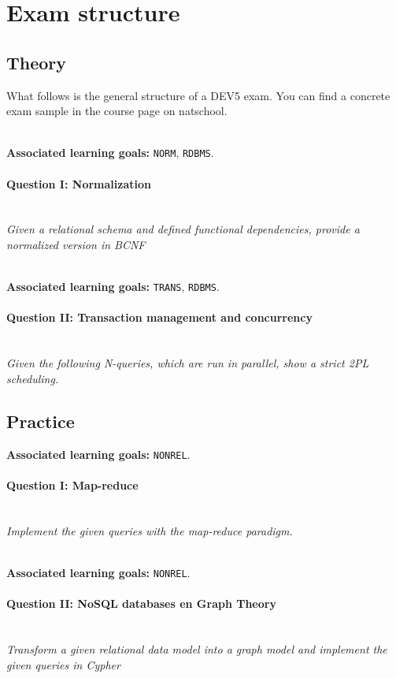 \section*{Exam structure}
\subsection*{Theory}
What follows is the general structure of a DEV5 exam. You can find a concrete exam sample in the course page on natschool.


\ \\ 
\textbf{Associated learning goals:} \texttt{NORM}, \texttt{RDBMS}.
\paragraph{Question I: Normalization} \ \\ 

\textit{Given a relational schema and defined functional dependencies, provide a normalized version in BCNF}

\ \\ 

\textbf{Associated learning goals:} \texttt{TRANS}, \texttt{RDBMS}.
\paragraph{Question II: Transaction management and concurrency}

\ \\ 

\textit{Given the following N-queries, which are run in parallel, show a strict 2PL scheduling. }

\subsection*{Practice}
\textbf{Associated learning goals:} \texttt{NONREL}.
\paragraph{Question I: Map-reduce}

\ \\ 

\textit{Implement the given queries with the map-reduce paradigm.}

\ \\ 
\textbf{Associated learning goals:} \texttt{NONREL}.
\paragraph{Question II: NoSQL databases en Graph Theory}

\ \\ 

\textit{Transform a given relational data model into a graph model and implement the given queries in Cypher}